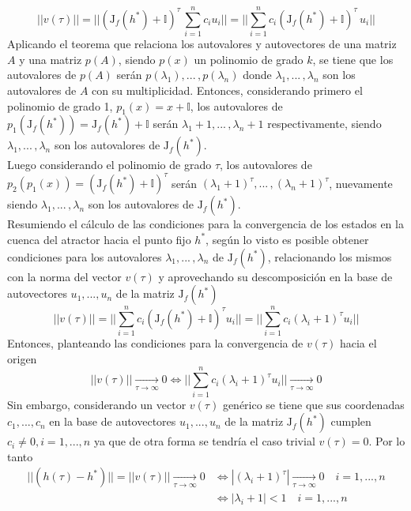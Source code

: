 \documentclass{article}
\begin{document}
	\begin{equation*}
	||v(\tau)|| = ||(\mathrm{J}_f(h^*) + \mathbb{I})^\tau \, \sum_{i=1}^{n} c_i u_i|| = || \sum_{i=1}^{n} c_i  (\mathrm{J}_f(h^*) + \mathbb{I})^\tau \, u_i||
	\end{equation*}
	Aplicando el teorema que relaciona los autovalores y autovectores de una matriz $A$ y una matriz $p(A)$, siendo $p(x)$ un polinomio de grado $k$, se tiene que los autovalores de $p(A)$ serán $p(\lambda_1), ... \,, p(\lambda_n)$ donde $\lambda_1, ... \,, \lambda_n$ son los autovalores de $A$ con su multiplicidad. Entonces, considerando primero el polinomio de grado 1, $p_1(x) = x + \mathbb{I}$, los autovalores de $p_1(\mathrm{J}_f(h^*)) = \mathrm{J}_f(h^*) + \mathbb{I}$ serán $\lambda_1 + 1, ... \,, \lambda_n + 1$ respectivamente, siendo $\lambda_1, ... \,, \lambda_n$ son los autovalores de $\mathrm{J}_f(h^*)$. \\
	Luego considerando el polinomio de grado $\tau$, los autovalores de $p_2(p_1(x)) = (\mathrm{J}_f(h^*) + \mathbb{I})^\tau$ serán $(\lambda_1 + 1)^\tau, ... \,, (\lambda_n + 1)^\tau$, nuevamente siendo $\lambda_1, ... \,, \lambda_n$ son los autovalores de $\mathrm{J}_f(h^*)$.\\
	Resumiendo el cálculo de las condiciones para la convergencia de los estados en la cuenca del atractor hacia el punto fijo $h^*$, según lo visto es posible obtener condiciones para los autovalores $\lambda_1, ... \,, \lambda_n$ de $\mathrm{J}_f(h^*)$, relacionando los mismos con la norma del vector $v(\tau)$ y aprovechando su descomposición en la base de autovectores ${ u_1, ... , u_n }$ de la matriz $\mathrm{J}_f(h^*)$
	\begin{equation*}
	||v(\tau)||  = || \sum_{i=1}^{n} c_i  (\mathrm{J}_f(h^*) + \mathbb{I})^\tau u_i|| = || \sum_{i=1}^{n} c_i  (\lambda_i + 1)^\tau u_i||
	\end{equation*}
	Entonces, planteando las condiciones para la convergencia de $v(\tau)$ hacia el origen
	\begin{equation*}
	||v(\tau)|| \xrightarrow[\tau \to \infty]{} 0 \iff || \sum_{i=1}^{n} c_i  (\lambda_i + 1)^\tau u_i|| \xrightarrow[\tau \to \infty]{} 0
	\end{equation*}
	Sin embargo, considerando un vector $v(\tau)$ genérico se tiene que sus coordenadas $c_1, ... , c_n$ en la base de autovectores ${ u_1, ... , u_n }$ de la matriz $\mathrm{J}_f(h^*)$ cumplen $c_i \neq 0, i = 1, ..., n$ ya que de otra forma se tendría el caso trivial $v(\tau) = 0$. Por lo tanto 
	\begin{equation*}
	\begin{split}
	||(h(\tau) - h^*)|| = ||v(\tau)|| \xrightarrow[\tau \to \infty]{} 0 &\iff |(\lambda_i + 1)^\tau| \xrightarrow[\tau \to \infty]{} 0 \quad i = 1, ..., n\\
	&\iff |\lambda_i + 1| < 1 \quad i = 1, ..., n
	\end{split}
	\end{equation*}
\end{document}
